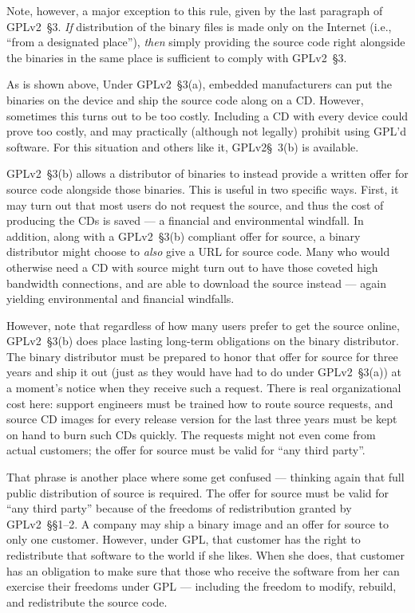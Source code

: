 Note, however, a major exception to this rule, given by the last paragraph
of GPLv2~\S3. \emph{If} distribution of the binary files is made only on the
Internet (i.e., ``from a designated place''), \emph{then} simply providing
the source code right alongside the binaries in the same place is
sufficient to comply with GPLv2~\S3.

\medskip

As is shown above, Under GPLv2~\S3(a), embedded manufacturers can put the
binaries on the device and ship the source code along on a CD\@.  However,
sometimes this turns out to be too costly.  Including a CD with every
device could prove too costly, and may practically (although not legally)
prohibit using GPL'd software. For this situation and others like it, GPLv2\S~3(b) is available.

GPLv2~\S3(b) allows a distributor of binaries to instead provide a written
offer for source code alongside those binaries.  This is useful in two
specific ways.  First, it may turn out that most users do not request the
source, and thus the cost of producing the CDs is saved --- a financial
and environmental windfall.  In addition, along with a GPLv2~\S3(b) compliant
offer for source, a binary distributor might choose to \emph{also} give a
URL for source code.  Many who would otherwise need a CD with source might
turn out to have those coveted high bandwidth connections, and are able to
download the source instead --- again yielding environmental and financial
windfalls.

However, note that regardless of how many users prefer to get the
source online, GPLv2~\S3(b) does place lasting long-term obligations on the
binary distributor.  The binary distributor must be prepared to honor
that offer for source for three years and ship it out (just as they
would have had to do under GPLv2~\S3(a)) at a moment's notice when they
receive such a request.  There is real organizational cost here:
support engineers must be trained how to route source requests, and
source CD images for every release version for the last three years
must be kept on hand to burn such CDs quickly. The requests might not
even come from actual customers; the offer for source must be valid
for ``any third party''.

That phrase is another place where some get confused --- thinking again
that full public distribution of source is required.  The offer for source
must be valid for ``any third party'' because of the freedoms of
redistribution granted by GPLv2~\S\S1--2.  A company may ship a binary image
and an offer for source to only one customer.  However, under GPL, that
customer has the right to redistribute that software to the world if she
likes.  When she does, that customer has an obligation to make sure that
those who receive the software from her can exercise their freedoms under
GPL --- including the freedom to modify, rebuild, and redistribute the
source code.

